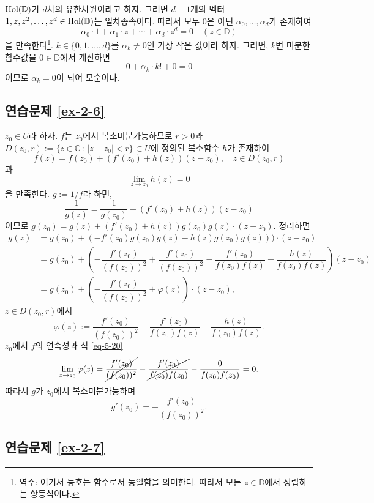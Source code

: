 $\Hol(\mathbb D)$가 $d$차의 유한차원이라고 하자.
그러면 $d+1$개의 벡터 $1,z, z^2, \ldots, z^d\in \Hol(\mathbb  D)$는
일차종속이다. 따라서 모두 $0$은 아닌 $\alpha_0, \ldots, \alpha_d$가 존재하여
\[
\alpha_0\cdot 1 + \alpha_1\cdot z + \cdots + \alpha_d \cdot z^d = 0
\quad(z\in \mathbb D)
\]
을 만족한다\footnote{
역주: 여기서 등호는 함수로서 동일함을 의미한다. 
따라서 모든 $z\in \mathbb D$에서 성립하는 항등식이다.
}.
$k\in \{0, 1, \ldots, d\}$를 $\alpha_k \ne 0$인 가장 작은 값이라 하자.
그러면, $k$번 미분한 함수값을 $0\in \mathbb D$에서 계산하면
\[
0 + \alpha_k \cdot k! + 0 = 0
\]
이므로 $\alpha_k=0$이 되어 모순이다.

\subsection*{연습문제 \ref{ex-2-6}}

$z_0\in U$라 하자. $f$는 $z_0$에서 복소미분가능하므로
$r>0$과 $D(z_0,r) := \{ z\in \mathbb C\,:\, |z-z_0|<r\} \subset U$에 정의된
복소함수 $h$가 존재하여
\[
f(z) = f(z_0) + (f'(z_0) +h(z))(z-z_0),
\quad z\in D(z_0,r)
\]
과
\begin{equation}\label{eq-5-20}
\lim_{z\to z_0} h(z)=0
\end{equation}
을 만족한다.
$g:=1/f$라 하면,
\[
\dfrac1{g(z)} = \dfrac1{g(z_0)} + (f'(z_0) +h(z))(z-z_0)
\]
이므로 $g(z_0) = g(z) + (f'(z_0)+h(z))g(z_0)g(z)\cdot(z-z_0)$.
정리하면
\begin{align*}
g(z) &= g(z_0) + (-f'(z_0)g(z_0)g(z) - h(z)g(z_0)g(z)))\cdot(z-z_0) \\
&= g(z_0) + \left( - \dfrac{f'(z_0)}{(f(z_0))^2} + \dfrac{f'(z_0)}{(f(z_0))^2}
- \dfrac{f'(z_0)}{f(z_0)f(z)} - \dfrac{h(z)}{f(z_0)f(z)} \right) (z-z_0) \\
&= g(z_0) + \left( - \dfrac{f'(z_0)}{(f(z_0))^2} + \varphi(z) \right)\cdot(z-z_0),
\end{align*}
$z\in D(z_0,r)$에서
\[
\varphi(z):= \dfrac{f'(z_0)}{(f(z_0))^2}
- \dfrac{f'(z_0)}{f(z_0)f(z)} - \dfrac{h(z)}{f(z_0)f(z)}.
\]
$z_0$에서 $f$의 연속성과 식 \eqref{eq-5-20}
\[
\lim_{z\to z_0} \varphi(z) = \cancel{\dfrac{f'(z_0)}{(f(z_0))^2}}
- \cancel{\dfrac{f'(z_0)}{f(z_0)f(z_0)}} - \dfrac{0}{f(z_0)f(z_0)} = 0.
\]
따라서 $g$가 $z_0$에서 복소미분가능하며
\[
g'(z_0) = - \dfrac{f'(z_0)}{(f(z_0))^2}.
\]

\subsection*{연습문제 \ref{ex-2-7}}

